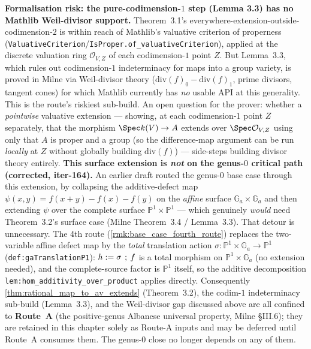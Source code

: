 \begin{remark}
  \label{rmk:thm32_codim1_mathlib_gap}
  \textbf{Formalisation risk: the pure-codimension-\(1\) step (Lemma 3.3) has no Mathlib
  Weil-divisor support.} Theorem~3.1's everywhere-extension-outside-codimension-\(2\) is within
  reach of Mathlib's valuative criterion of properness
  (\texttt{ValuativeCriterion}/\texttt{IsProper.of\_valuativeCriterion}), applied at the
  discrete valuation ring \(\mathcal O_{V, Z}\) of each codimension-\(1\) point \(Z\). But Lemma~3.3,
  which rules out codimension-\(1\) indeterminacy for maps into a group variety, is proved in
  Milne via Weil-divisor theory (\(\mathrm{div}(f)_0 - \mathrm{div}(f)_1\), prime divisors,
  tangent cones) for which Mathlib currently has \emph{no} usable API at this generality. This
  is the route's riskiest sub-build. An open question for the prover: whether a \emph{pointwise}
  valuative extension --- showing, at each codimension-\(1\) point \(Z\) separately, that the
  morphism \(\Spec k(V) \to A\) extends over \(\Spec \mathcal O_{V, Z}\) using only that \(A\) is
  proper and a group (so the difference-map argument can be run \emph{locally} at \(Z\) without
  globally building \(\mathrm{div}(f)\)) --- side-steps building divisor theory entirely.
  \textbf{This surface extension is \emph{not} on the genus-\(0\) critical path (corrected, iter-164).}
  An earlier draft routed the genus-\(0\) base case through this extension, by collapsing the
  additive-defect map \(\psi(x, y) = f(x + y) - f(x) - f(y)\) on the \emph{affine} surface
  \(\mathbb G_a \times \mathbb G_a\) and then extending \(\psi\) over the complete surface
  \(\mathbb P^1 \times \mathbb P^1\) --- which genuinely \emph{would} need Theorem~3.2's surface case
  (Milne Theorem~3.4 / Lemma~3.3). That detour is unnecessary. The 4th route
  (\cref{rmk:base_case_fourth_route}) replaces the two-variable affine defect map by the
  \emph{total} translation action \(\sigma \colon \mathbb P^1 \times \mathbb G_a \to \mathbb P^1\)
  (\texttt{def:gaTranslationP1}): \(h := \sigma \fatsemi f\) is a total morphism on \(\mathbb P^1
  \times \mathbb G_a\) (no extension needed), and the complete-source factor is \(\mathbb P^1\)
  itself, so the additive decomposition \texttt{lem:hom_additivity_over_product} applies directly.
  Consequently \cref{thm:rational_map_to_av_extends} (Theorem~3.2), the codim-\(1\) indeterminacy
  sub-build (Lemma~3.3), and the Weil-divisor gap discussed above are all confined to
  \textbf{Route~A} (the positive-genus Albanese universal property, Milne \S III.6); they are
  retained in this chapter solely as Route-A inputs and may be deferred until Route~A consumes
  them. The genus-\(0\) close no longer depends on any of them.
\end{remark}
